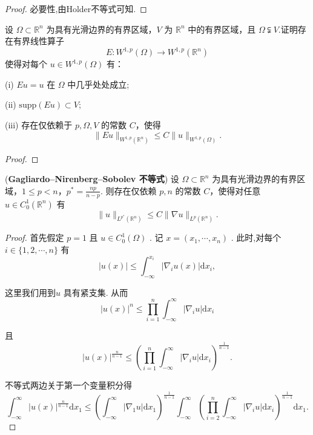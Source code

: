 \documentclass[lang=cn,newtx,10pt,scheme=chinese,thmcnt=chapter]{elegantbook}
\newcommand{\dif}{\mathrm{d}}
\begin{document}
\begin{problemset}
\begin{proof}
    必要性,由Holder不等式可知.
\end{proof}
\item 设 \(\Omega \subset {\mathbb{R}}^{n}\) 为具有光滑边界的有界区域，\(V\) 为 \({\mathbb{R}}^{n}\) 中的有界区域，且 \(\Omega \subsetneqq V\).证明存在有界线性算子
\[
E : {W}^{1,p}(\Omega) \to {W}^{1,p}({\mathbb{R}}^{n})
\]
使得对每个 \(u \in {W}^{1,p}(\Omega)\) 有：

(i) \({Eu} = u\) 在 \(\Omega\) 中几乎处处成立;

(ii) \(\mathrm{supp}(Eu) \subset V\);

(iii) 存在仅依赖于 \(p,\Omega,V\) 的常数 \(C\)，使得
\[
\|Eu\|_{{W}^{1,p}({\mathbb{R}}^{n})} \leqslant C\|u\|_{{W}^{1,p}(\Omega)}.
\]
\begin{proof}

\end{proof}
\item (\textbf{Gagliardo–Nirenberg–Sobolev 不等式})  
设 \(\Omega \subset {\mathbb{R}}^{n}\) 为具有光滑边界的有界区域，\(1 \leqslant p < n\)，\({p}^{*} = \frac{np}{n - p}\).  
则存在仅依赖 \(p,n\) 的常数 \(C\)，使得对任意 \(u \in {C}_{0}^{1}({\mathbb{R}}^{n})\) 有
\[
\|u\|_{L^{p^{*}}({\mathbb{R}}^{n})} \leqslant C\|\nabla u\|_{L^{p}({\mathbb{R}}^{n})}.
\]
\begin{proof}
 首先假定 \(p = 1\) 且 \(u \in  {C}_{0}^{1}\left( \Omega \right)\) . 记 \(x = \left( {{x}_{1},\cdots ,{x}_{n}}\right)\) . 此时,对每个 \(i \in  \{ 1,2,\cdots ,n\}\) 有
\begin{equation*}
\left| {u\left( x\right) }\right|  \leqslant  {\int }_{-\infty }^{{x}_{i}}\left| {{\nabla }_{i}u\left( x\right) }\right| \dif x_i,
\end{equation*}

这里我们用到\(u\) 具有紧支集. 从而
\begin{equation*}
{\left| u\left( x\right) \right| }^{n} \leqslant  \mathop{\prod }\limits_{{i = 1}}^{n}{\int }_{-\infty }^{\infty }\left| {{\nabla }_{i}u}\right| \dif x_i
\end{equation*}

且
\begin{equation*}
{\left| u\left( x\right) \right| }^{\frac{n}{n - 1}} \leqslant  {\left( \mathop{\prod }\limits_{{i = 1}}^{n}{\int }_{-\infty }^{\infty }\left| {\nabla }_{i}u\right| \dif x_i\right) }^{\frac{1}{n - 1}}.
\end{equation*}

不等式两边关于第一个变量积分得
\begin{equation*}
{\int }_{-\infty }^{\infty }{\left| u\left( x\right) \right| }^{\frac{n}{n - 1}}\dif x_1 \leqslant  {\left( {\int }_{-\infty }^{\infty }\left| {\nabla }_{1}u\right| \dif x_1\right) }^{\frac{1}{n - 1}}{\int }_{-\infty }^{\infty }{\left( \mathop{\prod }\limits_{{i = 2}}^{n}{\int }_{-\infty }^{\infty }\left| {\nabla }_{i}u\right| \dif x_i\right) }^{\frac{1}{n - 1}}\dif x_1.
\end{equation*}


\end{proof}
\end{problemset}
\end{document}
